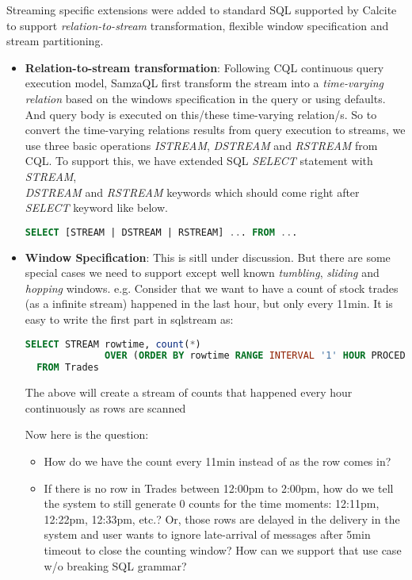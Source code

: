 \documentclass[10pt, conference, compsocconf]{IEEEtran}
\begin{document}
Streaming specific extensions were added to standard SQL supported by Calcite to support \textit{relation-to-stream} transformation, flexible window specification and stream partitioning.

\begin{itemize}
\item \textbf{Relation-to-stream transformation}: Following CQL \cite{arasu2006cql} continuous query execution model, SamzaQL first transform the stream into a \textit{time-varying relation} based on the windows specification in the query or using defaults. And query body is executed on this/these time-varying relation/s. So to convert the time-varying relations results from query execution to streams, we use three basic operations  \textit{ISTREAM}, \textit{DSTREAM} and \textit{RSTREAM} from CQL. To support this, we have extended SQL \textit{SELECT} statement with \textit{STREAM},\\ \textit{DSTREAM} and \textit{RSTREAM} keywords which should come right after \textit{SELECT} keyword like below.

\begin{lstlisting}[language=SQL]
SELECT [STREAM | DSTREAM | RSTREAM] ... FROM ...
\end{lstlisting}

\item \textbf{Window Specification}: This is sitll under discussion. But there are some special cases we need to support except well known \textit{tumbling}, \textit{sliding} and \textit{hopping} windows. e.g. Consider that we want to have a count of stock trades (as a infinite stream) happened in the last hour, but only every 11min. It is easy to write the first part in sqlstream as:

\begin{lstlisting}[language=SQL]
SELECT STREAM rowtime, count(*) 
              OVER (ORDER BY rowtime RANGE INTERVAL '1' HOUR PROCEDING)
  FROM Trades
\end{lstlisting}
The above will create a stream of counts that happened every hour continuously as rows are scanned

Now here is the question:
\begin{itemize}
\item How do we have the count every 11min instead of as the row comes in?
\item If there is no row in Trades between 12:00pm to 2:00pm, how do we tell the system to still generate 0 counts for the time moments: 12:11pm, 12:22pm, 12:33pm, etc.? Or, those rows are delayed in the delivery in the system and user wants to ignore late-arrival of messages after 5min timeout to close the counting window? How can we support that use case w/o breaking SQL grammar?
\end{itemize}


\end{itemize}
\end{document}
